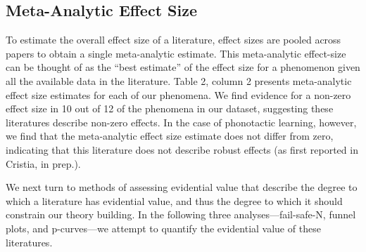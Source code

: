 \documentclass[english,floatsintext,man]{apa6}
\theoremstyle{definition}
\theoremstyle{definition}
\theoremstyle{remark}
\begin{document}
\subsection{Meta-Analytic Effect Size}\label{meta-analytic-effect-size}

To estimate the overall effect size of a literature, effect sizes are
pooled across papers to obtain a single meta-analytic estimate. This
meta-analytic effect-size can be thought of as the \enquote{best
estimate} of the effect size for a phenomenon given all the available
data in the literature. Table 2, column 2 presents meta-analytic effect
size estimates for each of our phenomena. We find evidence for a
non-zero effect size in 10 out of 12 of the phenomena in our dataset,
suggesting these literatures describe non-zero effects. In the case of
phonotactic learning, however, we find that the meta-analytic effect
size estimate does not differ from zero, indicating that this literature
does not describe robust effects (as first reported in Cristia, in
prep.).

We next turn to methods of assessing evidential value that describe the
degree to which a literature has evidential value, and thus the degree
to which it should constrain our theory building. In the following three
analyses---fail-safe-N, funnel plots, and p-curves---we attempt to
quantify the evidential value of these literatures.
\end{document}

